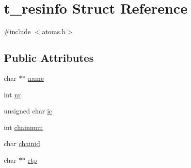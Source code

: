 \hypertarget{structt__resinfo}{\section{t\-\_\-resinfo \-Struct \-Reference}
\label{structt__resinfo}
}


{\ttfamily \#include $<$atoms.\-h$>$}

\subsection*{\-Public \-Attributes}
\begin{DoxyCompactItemize}
\item 
char $\ast$$\ast$ \hyperlink{structt__resinfo_ad0ab49ead9e77c50d5b672f947f7bf69}{name}
\item 
int \hyperlink{structt__resinfo_a743ca7c25ee0a21d0d1220be098e1286}{nr}
\item 
unsigned char \hyperlink{structt__resinfo_a6436ea521e41c1f269436a4cecd39a4a}{ic}
\item 
int \hyperlink{structt__resinfo_aaedd414f71b7b89fa140bf0cab78904f}{chainnum}
\item 
char \hyperlink{structt__resinfo_a1e88abc1224a813649ccb93edcc0d68d}{chainid}
\item 
char $\ast$$\ast$ \hyperlink{structt__resinfo_a8f3297455e8356f181bde1c566ff6685}{rtp}
\end{DoxyCompactItemize}


